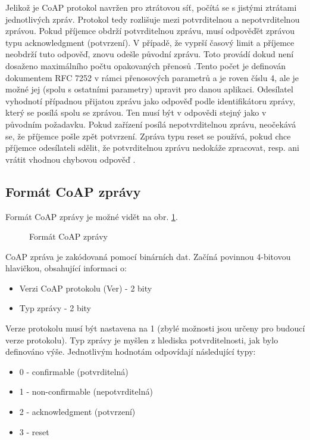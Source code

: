 Jelikož je CoAP protokol navržen pro ztrátovou síť, počítá se s jistými ztrátami jednotlivých zpráv. Protokol tedy rozlišuje mezi potvrditelnou a nepotvrditelnou zprávou. Pokud příjemce obdrží potvrditelnou zprávu, musí odpověďět zprávou typu acknowledgment (potvrzení). V případě, že vyprší časový limit a příjemce neobdrží tuto odpověď, znovu odešle původní zprávu. Toto provádí dokud není dosaženo maximálního počtu opakovaných přenosů \cite{CoAPCongestionControl}.Tento počet je definován dokumentem RFC 7252 v rámci přenosových parametrů a je roven číslu 4, ale je možné jej (spolu s ostatními parametry) upravit pro danou aplikaci. Odesílatel vyhodnotí případnou přijatou zprávu jako odpověď podle identifikátoru zprávy, který se posílá spolu se zprávou. Ten musí být v odpovědi stejný jako v původním požadavku. Pokud zařízení posílá nepotvrditelnou zprávu, neočekává se, že příjemce pošle zpět potvrzení. Zpráva typu reset se používá, pokud chce příjemce odesílateli sdělit, že potvrditelnou zprávu nedokáže zpracovat, resp. ani vrátit vhodnou chybovou odpověď \cite{RFC7252}.

\subsection*{Formát CoAP zprávy}
Formát CoAP zprávy je možné vidět na obr. \ref{coap-format}.
\begin{figure}[hbt]
	\centering
	\caption{Formát CoAP zprávy\protect\footnotemark }
	\label{coap-format}
\end{figure}
 
CoAP zpráva je zakódovaná pomocí binárních dat. Začíná povinnou 4-bitovou hlavičkou, obsahující informaci o:
\begin{itemize}
    \item Verzi CoAP protokolu (Ver) - 2 bity
    \item Typ zprávy - 2 bity
\end{itemize}
Verze protokolu musí být nastavena na 1 (zbylé možnosti jsou určeny pro budoucí verze protokolu). Typ zprávy je myšlen z hlediska potvrditelnosti, jak bylo definováno výše. Jednotlivým hodnotám odpovídají následující typy:
\begin{itemize}
    \item 0 - confirmable (potvrditelná)
    \item 1 - non-confirmable (nepotvrditelná)
    \item 2 - acknowledgment (potvrzení)
    \item 3 - reset
\end{itemize}

